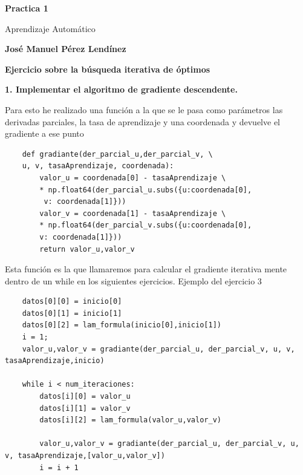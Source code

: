 \documentclass[titlepage]{article}
\begin{document}
	\begin{titlepage}
		\begin{center}
			\vspace*{1cm}
			\date{} %
			\Huge
			\textbf{Practica 1}
			
			\vspace{0.5cm}
			\LARGE
			Aprendizaje Automático
			
			\vspace{1.5cm}
			
			\textbf{José Manuel Pérez Lendínez}
			

			
		\end{center}
	\end{titlepage}

 \newpage
 	\large
 	\textbf{Ejercicio sobre la búsqueda iterativa de óptimos}
 	\newline
 	
 	\textbf{1. Implementar el algoritmo de gradiente descendente.}
 	
 	\normalfont
 	\vspace{0.5cm}
 	
 	Para esto he realizado una función a la que se le pasa como parámetros las derivadas parciales, la tasa de aprendizaje y una coordenada y devuelve el gradiente a ese punto
	 
 	\begin{lstlisting}
 	def gradiante(der_parcial_u,der_parcial_v, \ 
 	u, v, tasaAprendizaje, coordenada):
 		valor_u = coordenada[0] - tasaAprendizaje \
 		* np.float64(der_parcial_u.subs({u:coordenada[0],
 		 v: coordenada[1]}))
 		valor_v = coordenada[1] - tasaAprendizaje \
 		* np.float64(der_parcial_v.subs({u:coordenada[0], 
 		v: coordenada[1]}))
 		return valor_u,valor_v
 	\end{lstlisting}
 	
 	Esta función es la que llamaremos para calcular el gradiente iterativa mente dentro de un while en los siguientes ejercicios.
 	Ejemplo del ejercicio 3
 	
 	\begin{lstlisting}
	datos[0][0] = inicio[0]
	datos[0][1] = inicio[1]
	datos[0][2] = lam_formula(inicio[0],inicio[1])
	i = 1;
	valor_u,valor_v = gradiante(der_parcial_u, der_parcial_v, u, v, tasaAprendizaje,inicio)
 		
 	while i < num_iteraciones:
		datos[i][0] = valor_u
		datos[i][1] = valor_v
		datos[i][2] = lam_formula(valor_u,valor_v)
 		
 		valor_u,valor_v = gradiante(der_parcial_u, der_parcial_v, u, v, tasaAprendizaje,[valor_u,valor_v])
 		i = i + 1
 		
 	\end{lstlisting}
 	
\end{document}
